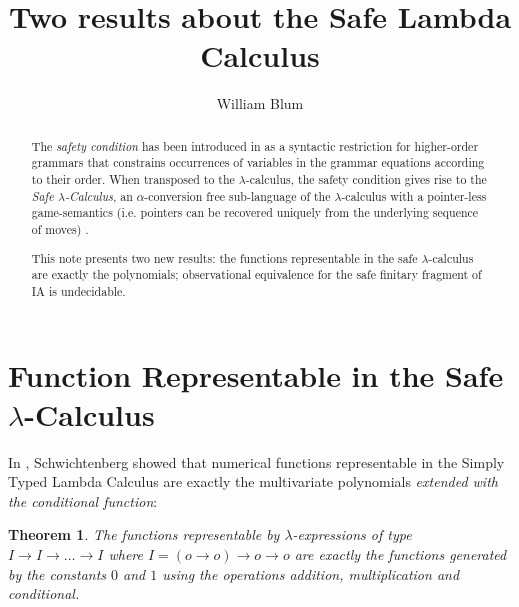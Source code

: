 \documentclass{article}
\author{William Blum}
\title{Two results about the Safe Lambda Calculus}
\newtheorem{theorem}{Theorem}[section]
\begin{document}
\maketitle

\begin{abstract}
The \emph{safety condition} has been introduced in \cite{KNU02} as a syntactic restriction for higher-order grammars that constrains occurrences of variables in the grammar equations according to their order. When transposed to the $\lambda$-calculus, the safety condition gives rise to the \emph{Safe $\lambda$-Calculus}, an $\alpha$-conversion free sub-language of the $\lambda$-calculus with a pointer-less game-semantics (i.e. pointers can be recovered uniquely from the underlying sequence of moves) \cite{blumtransfer}.

This note presents two new results: the functions representable in the safe $\lambda$-calculus are exactly the polynomials; observational equivalence for the safe finitary fragment of IA is undecidable.
\end{abstract}

\section{Function Representable in the Safe $\lambda$-Calculus}

In \cite{citeulike:622637}, Schwichtenberg showed that 
numerical functions representable in the Simply Typed Lambda Calculus are exactly the multivariate polynomials \emph{extended with the conditional function}:
\begin{theorem}
The functions representable by $\lambda$-expressions of type $I\rightarrow I \rightarrow \ldots \rightarrow I$ where $I = (o\rightarrow o)\rightarrow o\rightarrow o$ are exactly the functions generated by the constants $0$ and $1$ using the operations addition, multiplication and conditional.
\end{theorem}
\end{document}
